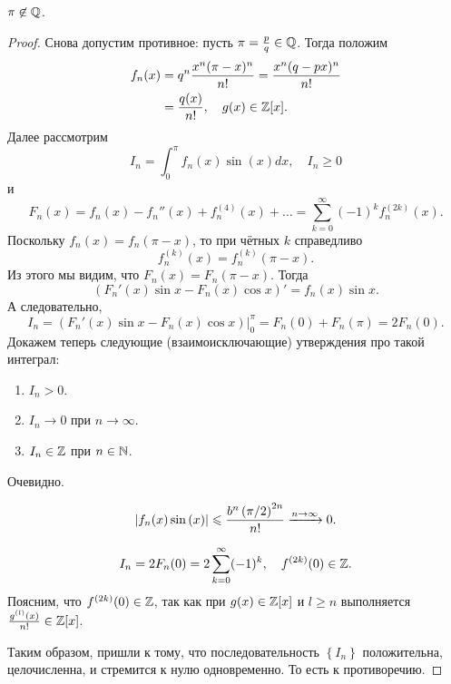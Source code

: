 \begin{ntheorem}
\label{thm:III_PI-irrationality}
    $\pi \not \in \mathbb{Q}$.
\end{ntheorem}
\begin{proof}
    Снова допустим противное: пусть $\pi = \frac{p}{q} \in \mathbb{Q}$. Тогда положим 
    \begin{align*}
        f_n(x) &= q^n\frac{x^n (\pi - x)^n}{n!} = \frac{x^n(q - px)^n}{n!} \\
        &= \frac{q(x)}{n!}, \quad g(x) \in \mathbb{Z}[x].
    \end{align*}
    Далее рассмотрим
    \[
        I_n = \int_{0}^{\pi} f_n(x)\sin(x)dx, \quad I_n \ge 0
    \]
    и
    \[
        F_n(x) = f_n(x) - f_n''(x) + f_n^{(4)}(x) + \dots = \sum_{k = 0}^{\infty} (-1)^k f_n^{(2k)}(x).
    \]
    Поскольку $f_n(x) = f_n(\pi-x)$, то при чётных $k$ справедливо
    \[
        f_n^{(k)}(x) = f_n^{(k)}(\pi - x).
    \]
    Из этого мы видим, что $F_n(x) = F_n(\pi - x)$. Тогда
    \[
        \left( F_n'(x)\sin{x} - F_n(x)\cos{x} \right)' = f_n(x)\sin x.
    \]
    А следовательно,
    \[
        I_n = \left( F_n'(x)\sin{x} - F_n(x)\cos{x} \right)\Bigr|_0^\pi = F_n(0) + F_n(\pi) = 2F_n(0).
    \]
    Докажем теперь следующие (взаимоисключающие) утверждения про такой интеграл:
    \begin{enumerate}
        \item $I_n > 0$.
        \item $I_n \to 0$ при $n \to \infty$.
        \item $I_n \in \mathbb{Z}$ при $n \in \mathbb{N}$.
    \end{enumerate}
    \begin{statesp}
        \item
            Очевидно.
        \item
            \[
                \left| f_n(x)\operatorname{sin}\left( x \right) \right| \leqslant \frac{b^n\left( \pi / 2 \right)^{2n}}{n!} \xrightarrow{n \to \infty} 0.
            \]
        \item
            \[
                I_n = 2F_n(0) = 2 \sum_{k=0}^{\infty} (-1)^k, \quad f^{(2k)}(0) \in \mathbb{Z}.
            \]
            Поясним, что $f^{(2k)}(0) \in \mathbb{Z}$, так как при $g(x) \in \mathbb{Z}[x]$ и $l \ge n$ выполняется $\frac{g^{(l)}(x)}{n!} \in \mathbb{Z}[x]$.
    \end{statesp}
    Таким образом, пришли к тому, что последовательность $\left\{ I_n \right\}$ положительна, целочисленна, и стремится к нулю одновременно. То есть к противоречию.
\end{proof}
